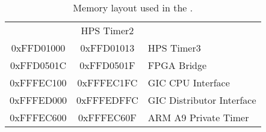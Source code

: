 \begin{table}[h]
\begin{center}
\begin{tabular}{c|c|l}
            & HPS Timer2
        \\
            0xFFD01000
            & 0xFFD01013
            & HPS Timer3
        \\
            0xFFD0501C
            & 0xFFD0501F
            & FPGA Bridge
        \\
            0xFFFEC100
            & 0xFFFEC1FC
            & GIC CPU Interface
        \\
            0xFFFED000
            & 0xFFFEDFFC
            & GIC Distributor Interface
        \\
            0xFFFEC600
            & 0xFFFEC60F
            & ARM A9 Private Timer
        \\
    \end{tabular}
    \caption{Memory layout used in the \systemName.}
    \label{tab:memorylayout}
    \end{center}
\end{table}




\clearpage














